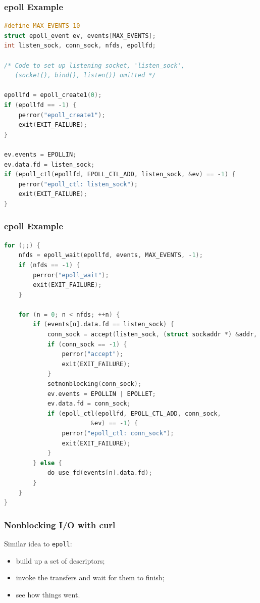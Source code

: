 

\begin{frame}[fragile]
\frametitle{epoll Example}

\begin{lstlisting}[language=C]
#define MAX_EVENTS 10
struct epoll_event ev, events[MAX_EVENTS];
int listen_sock, conn_sock, nfds, epollfd;

/* Code to set up listening socket, 'listen_sock',
   (socket(), bind(), listen()) omitted */

epollfd = epoll_create1(0);
if (epollfd == -1) {
    perror("epoll_create1");
    exit(EXIT_FAILURE);
}

ev.events = EPOLLIN;
ev.data.fd = listen_sock;
if (epoll_ctl(epollfd, EPOLL_CTL_ADD, listen_sock, &ev) == -1) {
    perror("epoll_ctl: listen_sock");
    exit(EXIT_FAILURE);
}
\end{lstlisting}


\end{frame}

\begin{frame}[fragile]
\frametitle{epoll Example}

\begin{lstlisting}[language=C]
for (;;) {
    nfds = epoll_wait(epollfd, events, MAX_EVENTS, -1);
    if (nfds == -1) {
        perror("epoll_wait");
        exit(EXIT_FAILURE);
    }

    for (n = 0; n < nfds; ++n) {
        if (events[n].data.fd == listen_sock) {
            conn_sock = accept(listen_sock, (struct sockaddr *) &addr, &addrlen);
            if (conn_sock == -1) {
                perror("accept");
                exit(EXIT_FAILURE);
            }
            setnonblocking(conn_sock);
            ev.events = EPOLLIN | EPOLLET;
            ev.data.fd = conn_sock;
            if (epoll_ctl(epollfd, EPOLL_CTL_ADD, conn_sock,
                        &ev) == -1) {
                perror("epoll_ctl: conn_sock");
                exit(EXIT_FAILURE);
            }
        } else {
            do_use_fd(events[n].data.fd);
        }
    }
}
\end{lstlisting}


\end{frame}


\begin{frame}
  \frametitle{Nonblocking I/O with curl}
  
    Similar idea to {\tt epoll}:
\begin{itemize}
\item build up a set of descriptors;
\item invoke the transfers and wait for them to finish;
\item see how things went.
\end{itemize}
  
\end{frame}


